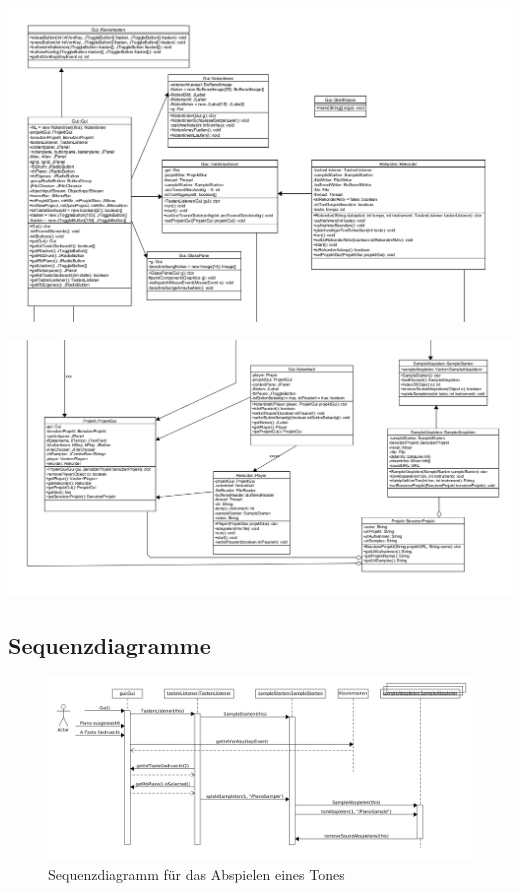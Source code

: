 {\centering
\includegraphics[scale=0.5]{Bilder/GUIKlassendia/TeilOben.PNG} 

\medskip
\includegraphics[scale=0.5]{Bilder/GUIKlassendia/TeilUnten.PNG} 

}

\newpage

\subsection{Sequenzdiagramme}


\begin{figure}[h]
 \centering
 \includegraphics[width=1\textwidth]{./Bilder/Klaviertaste_Gedrueckt.png}
 \caption{Sequenzdiagramm für das Abspielen eines Tones}
\end{figure}


